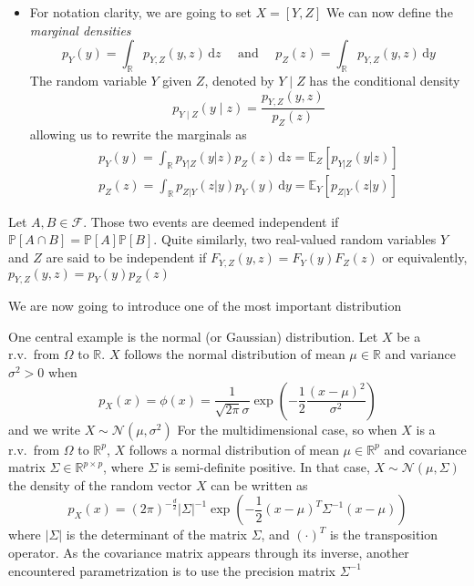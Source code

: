 \documentclass[a4paper,11pt]{article}
\newcommand{\Ex}{\mathbb{E}}
\newcommand{\Prob}{\mathbb{P}}
\theoremstyle{defi}
\numberwithin{thmCounter}{section}
\begin{document}
\begin{definition}
\begin{itemize}
  
\item For notation clarity, we are going to set $X = [Y,Z]$
  We can now define the \emph{marginal densities}
  \begin{equation}
    \label{eq:marginals_def}
    p_{Y}(y) = \int_{\mathbb{R}}p_{Y,Z}(y,z) \,\mathrm{d}z \quad \text{ and } \quad p_{Z}(z) = \int_{\mathbb{R}}p_{Y,Z}(y,z) \,\mathrm{d}y
  \end{equation}
  The random variable $Y$ given $Z$, denoted by $Y \mid Z$ has the conditional density
  \begin{equation*}
    p_{Y \mid Z}(y \mid z) = \frac{p_{Y,Z}(y,z)}{p_Z(z)}
  \end{equation*}
  allowing us to rewrite the marginals as
  \begin{align}
    \label{eq:marginal_conditioned}
        p_{Y}(y) = \int_{\mathbb{R}}p_{Y|Z}(y|z)p_Z(z) \,\mathrm{d}z=\Ex_Z\left[p_{Y|Z}(y|z)\right] \\ p_{Z}(z) = \int_{\mathbb{R}}p_{Z|Y}(z|y)p_Y(y) \,\mathrm{d}y = \Ex_{Y}\left[p_{Z|Y}(z|y)\right]
  \end{align}
  

\end{itemize}
\end{definition}
\begin{definition}[Independence]
  Let $A,B\in \mathcal{F}$. Those two events are deemed independent if $\Prob[A \cap B] = \Prob[A]\Prob[B]$.
  Quite similarly, two real-valued random variables $Y$ and $Z$ are said to be independent if $F_{Y,Z}(y,z) = F_Y(y) F_Z(z)$ or equivalently, $p_{Y,Z}(y,z) = p_Y(y) p_Z(z)$
\end{definition}
We are now going to introduce one of the most important distribution
\begin{example}
  \label{ex:gaussian_distribution}
  One central example is the normal (or Gaussian) distribution. Let $X$ be a r.v.\ from $\Omega$ to $\mathbb{R}$.
  $X$ follows the normal distribution of mean $\mu \in \mathbb{R}$ and variance $\sigma^2>0$ when
  \begin{equation*}
    p_X(x) = \phi(x) = \frac{1}{\sqrt{2\pi}\sigma}\exp\left(-\frac{1}{2}\frac{(x-\mu)^2}{\sigma^2}\right)
  \end{equation*}
and we write $X \sim \mathcal{N}(\mu,\sigma^2)$
For the multidimensional case, so when $X$ is a r.v.\ from $\Omega$ to $\mathbb{R}^p$,
$X$ follows a normal distribution of mean $\mu \in \mathbb{R}^p$ and covariance matrix $\Sigma \in \mathbb{R}^{p\times p}$, where $\Sigma$ is semi-definite positive.
In that case, $X\sim \mathcal{N}(\mu, \Sigma)$ the density of the random vector $X$ can be written as
\begin{equation*}
    p_X(x) = (2\pi)^{-\frac{d}{2}}\lvert\Sigma\rvert^{-1}\exp\left(-\frac{1}{2}(x-\mu)^T\Sigma^{-1}(x-\mu)\right)
  \end{equation*}
  where $|\Sigma|$ is the determinant of the matrix $\Sigma$, and $(\cdot)^T$ is the transposition operator.
  As the covariance matrix appears through its inverse, another encountered parametrization is to use the precision matrix $\Sigma^{-1}$
\end{example}
\end{document}
